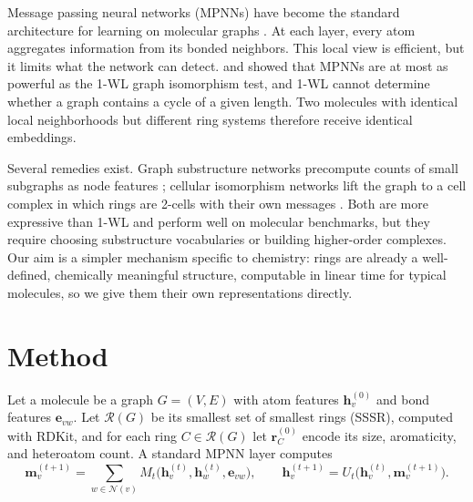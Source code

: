 \documentclass[11pt]{article}
\newcommand{\N}{\mathcal{N}}
\newcommand{\R}{\mathcal{R}}
\newcommand{\h}{\mathbf{h}}
\newcommand{\rr}{\mathbf{r}}
\newcommand{\e}{\mathbf{e}}
\begin{document}
Message passing neural networks (MPNNs) have become the standard architecture for learning on molecular graphs \cite{gilmer2017,yang2019}. At each layer, every atom aggregates information from its bonded neighbors. This local view is efficient, but it limits what the network can detect. \citet{xu2019} and \citet{morris2019} showed that MPNNs are at most as powerful as the 1-WL graph isomorphism test, and 1-WL cannot determine whether a graph contains a cycle of a given length. Two molecules with identical local neighborhoods but different ring systems therefore receive identical embeddings.

Several remedies exist. Graph substructure networks precompute counts of small subgraphs as node features \cite{bouritsas2023}; cellular isomorphism networks lift the graph to a cell complex in which rings are 2-cells with their own messages \cite{bodnar2021}. Both are more expressive than 1-WL and perform well on molecular benchmarks, but they require choosing substructure vocabularies or building higher-order complexes. Our aim is a simpler mechanism specific to chemistry: rings are already a well-defined, chemically meaningful structure, computable in linear time for typical molecules, so we give them their own representations directly.

\section{Method}

Let a molecule be a graph $G = (V, E)$ with atom features $\h_v^{(0)}$ and bond features $\e_{vw}$. Let $\R(G)$ be its smallest set of smallest rings (SSSR), computed with RDKit, and for each ring $C \in \R(G)$ let $\rr_C^{(0)}$ encode its size, aromaticity, and heteroatom count. A standard MPNN layer computes
\begin{equation}
  \mathbf{m}_v^{(t+1)} = \sum_{w \in \N(v)} M_t\bigl(\h_v^{(t)}, \h_w^{(t)}, \e_{vw}\bigr), \qquad
  \h_v^{(t+1)} = U_t\bigl(\h_v^{(t)}, \mathbf{m}_v^{(t+1)}\bigr).
  \label{eq:mpnn}
\end{equation}
\end{document}
